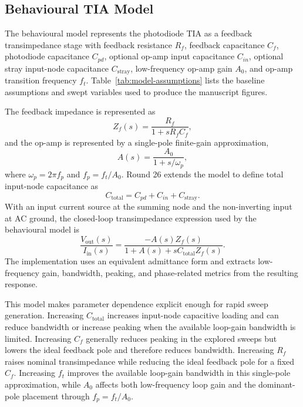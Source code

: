 \subsection{Behavioural TIA Model}

The behavioural model represents the photodiode TIA as a feedback transimpedance stage with feedback resistance $R_f$, feedback capacitance $C_f$, photodiode capacitance $C_{pd}$, optional op-amp input capacitance $C_{in}$, optional stray input-node capacitance $C_{\mathrm{stray}}$, low-frequency op-amp gain $A_0$, and op-amp transition frequency $f_t$. Table~\ref{tab:model-assumptions} lists the baseline assumptions and swept variables used to produce the manuscript figures.

The feedback impedance is represented as
\begin{equation}
Z_f(s)=\frac{R_f}{1+sR_fC_f},
\end{equation}
and the op-amp is represented by a single-pole finite-gain approximation,
\begin{equation}
A(s)=\frac{A_0}{1+s/\omega_p},
\end{equation}
where $\omega_p=2\pi f_p$ and $f_p=f_t/A_0$. Round 26 extends the model to define total input-node capacitance as
\begin{equation}
C_{\mathrm{total}} = C_{pd}+C_{in}+C_{\mathrm{stray}}.
\end{equation}
With an input current source at the summing node and the non-inverting input at AC ground, the closed-loop transimpedance expression used by the behavioural model is
\begin{equation}
\frac{V_{\mathrm{out}}(s)}{I_{\mathrm{in}}(s)} =
\frac{-A(s)Z_f(s)}{1+A(s)+sC_{\mathrm{total}}Z_f(s)}.
\end{equation}
The implementation uses an equivalent admittance form and extracts low-frequency gain, bandwidth, peaking, and phase-related metrics from the resulting response.

This model makes parameter dependence explicit enough for rapid sweep generation. Increasing $C_{\mathrm{total}}$ increases input-node capacitive loading and can reduce bandwidth or increase peaking when the available loop-gain bandwidth is limited. Increasing $C_f$ generally reduces peaking in the explored sweeps but lowers the ideal feedback pole and therefore reduces bandwidth. Increasing $R_f$ raises nominal transimpedance while reducing the ideal feedback pole for a fixed $C_f$. Increasing $f_t$ improves the available loop-gain bandwidth in this single-pole approximation, while $A_0$ affects both low-frequency loop gain and the dominant-pole placement through $f_p=f_t/A_0$.

